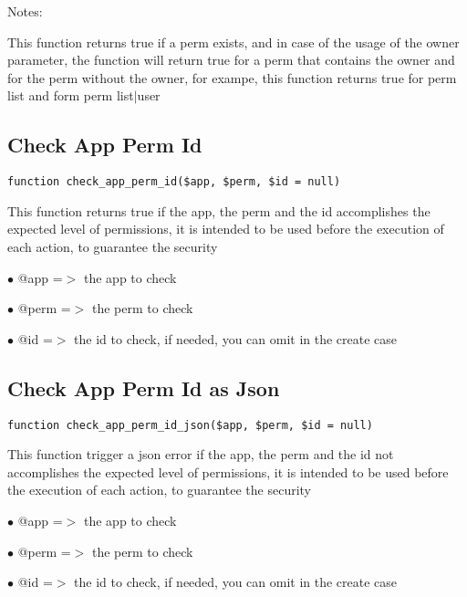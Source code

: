 \documentclass[a4paper]{book}
\begin{document}
Notes:

This function returns true if a perm exists, and in case of the usage
of the owner parameter, the function will return true for a perm that
contains the owner and for the perm without the owner, for exampe, this
function returns true for perm list and form perm list$|$user

\hypertarget{toc226}{}
\subsection{Check App Perm Id}

\begin{lstlisting}
function check_app_perm_id($app, $perm, $id = null)
\end{lstlisting}

This function returns true if the app, the perm and the id accomplishes the
expected level of permissions, it is intended to be used before the execution
of each action, to guarantee the security

\begin{compactitem}
\item[\color{myblue}$\bullet$] @app  =$>$ the app to check
\item[\color{myblue}$\bullet$] @perm =$>$ the perm to check
\item[\color{myblue}$\bullet$] @id   =$>$ the id to check, if needed, you can omit in the create case
\end{compactitem}

\hypertarget{toc227}{}
\subsection{Check App Perm Id as Json}

\begin{lstlisting}
function check_app_perm_id_json($app, $perm, $id = null)
\end{lstlisting}

This function trigger a json error if the app, the perm and the id not
accomplishes the expected level of permissions, it is intended to be used
before the execution of each action, to guarantee the security

\begin{compactitem}
\item[\color{myblue}$\bullet$] @app  =$>$ the app to check
\item[\color{myblue}$\bullet$] @perm =$>$ the perm to check
\item[\color{myblue}$\bullet$] @id   =$>$ the id to check, if needed, you can omit in the create case
\end{compactitem}
\end{document}
